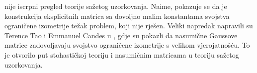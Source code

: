 \documentclass[a4paper,twoside,12pt]{memoir} %
\begin{document}
\begin{sazetak}
nije iscrpni pregled teorije sa\v{z}etog uzorkovanja. Naime, pokazuje se da je konstrukcija eksplicitnih matrica sa dovoljno malim konstantama svojstva ograni\v{c}ene izometrije te\v{z}ak problem, koji nije rje\v{s}en. Veliki napredak napravili su Terence Tao i Emmanuel Candes u \cite{CandesTao}, gdje su pokazli da nasumi\v{c}ne Gaussove matrice zadovoljavaju svojstvo ograni\v{c}ene izometrije s velikom vjerojatno\v{s}\'cu. To je otvorilo put stohasti\v{c}koj teoriju i nasumi\v{c}nim matricama u teoriju sa\v{z}etog uzorkovanja.
\end{sazetak}

\begin{summary}
\end{summary}


\begin{cv}
\end{cv}
\end{document}
